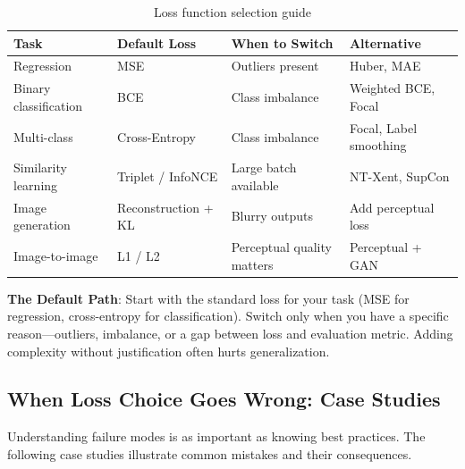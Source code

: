 \documentclass[../../main.tex]{subfiles}
\begin{document}
\begin{table}[htbp]
\centering
\caption{Loss function selection guide}
\label{tab:loss-selection-extended}
\begin{tabular}{@{}p{2.5cm}p{3.5cm}p{4cm}p{3cm}@{}}
\toprule
\textbf{Task} & \textbf{Default Loss} & \textbf{When to Switch} & \textbf{Alternative} \\
\midrule
Regression & MSE & Outliers present & Huber, MAE \\
\addlinespace
Binary classification & BCE & Class imbalance & Weighted BCE, Focal \\
\addlinespace
Multi-class & Cross-Entropy & Class imbalance & Focal, Label smoothing \\
\addlinespace
Similarity learning & Triplet / InfoNCE & Large batch available & NT-Xent, SupCon \\
\addlinespace
Image generation & Reconstruction + KL & Blurry outputs & Add perceptual loss \\
\addlinespace
Image-to-image & L1 / L2 & Perceptual quality matters & Perceptual + GAN \\
\bottomrule
\end{tabular}
\end{table}

\begin{intuition}
\textbf{The Default Path}: Start with the standard loss for your task (MSE for regression, cross-entropy for classification). Switch only when you have a specific reason---outliers, imbalance, or a gap between loss and evaluation metric. Adding complexity without justification often hurts generalization.
\end{intuition}

\subsection{When Loss Choice Goes Wrong: Case Studies}

Understanding failure modes is as important as knowing best practices. The following case studies illustrate common mistakes and their consequences.
\end{document}
